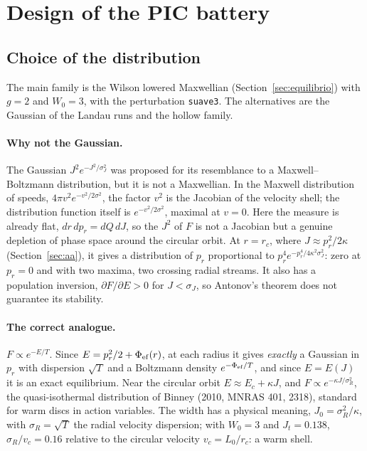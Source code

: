 \documentclass[11pt,a4paper]{article}
\begin{document}
\section{Design of the PIC battery}
\label{sec:diseno}

\subsection{Choice of the distribution}
\label{sec:familia}

The main family is the Wilson lowered Maxwellian (Section~\ref{sec:equilibrio}) with $g=2$
and $W_0=3$, with the perturbation \texttt{suave3}. The alternatives are the Gaussian of
the Landau runs and the hollow family.

\paragraph{Why not the Gaussian.} The Gaussian $J^2e^{-J^2/\sigma_J^2}$ was proposed for its
resemblance to a Maxwell--Boltzmann distribution, but it is not a Maxwellian. In the
Maxwell distribution of speeds, $4\pi v^2e^{-v^2/2\sigma^2}$, the factor $v^2$ is the Jacobian of
the velocity shell; the distribution function itself is $e^{-v^2/2\sigma^2}$, maximal at
$v=0$. Here the measure is already flat, $dr\,dp_r=dQ\,dJ$, so the $J^2$ of $F$ is not a
Jacobian but a genuine depletion of phase space around the circular orbit. At $r=r_c$,
where $J\approx p_r^2/2\kappa$ (Section~\ref{sec:aa}), it gives a distribution of $p_r$
proportional to $p_r^4e^{-p_r^4/4\kappa^2\sigma_J^2}$: zero at $p_r=0$ and with two maxima, two
crossing radial streams. It also has a population inversion, $\partial F/\partial E>0$ for
$J<\sigma_J$, so Antonov's theorem does not guarantee its stability.

\paragraph{The correct analogue.} $F\propto e^{-E/T}$. Since $E=p_r^2/2+\Phi_{\rm ef}(r)$, at each
radius it gives \emph{exactly} a Gaussian in $p_r$ with dispersion $\sqrt T$ and a Boltzmann
density $e^{-\Phi_{\rm ef}/T}$, and since $E=E(J)$ it is an exact equilibrium. Near the circular
orbit $E\approx E_c+\kappa J$, and $F\propto e^{-\kappa J/\sigma_R^2}$, the quasi-isothermal distribution of
Binney (2010, MNRAS 401, 2318), standard for warm discs in action variables. The width
has a physical meaning, $J_0=\sigma_R^2/\kappa$, with $\sigma_R=\sqrt T$ the radial velocity dispersion;
with $W_0=3$ and $J_t=0.138$, $\sigma_R/v_c=0.16$ relative to the circular velocity
$v_c=L_0/r_c$: a warm shell.
\end{document}
